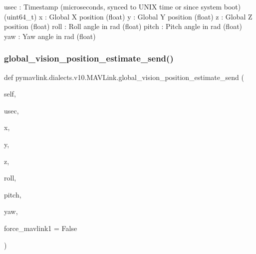 \begin{DoxyVerb}
\begin{DoxyVerb}
\begin{DoxyVerb}usec                      : Timestamp (microseconds, synced to UNIX time or since system boot) (uint64_t)
x                         : Global X position (float)
y                         : Global Y position (float)
z                         : Global Z position (float)
roll                      : Roll angle in rad (float)
pitch                     : Pitch angle in rad (float)
yaw                       : Yaw angle in rad (float)\end{DoxyVerb}
 \mbox{\label{classpymavlink_1_1dialects_1_1v10_1_1MAVLink_a15271ee045cbb9a4bc12fec96e6a43bc}} 
\subsubsection{\texorpdfstring{global\+\_\+vision\+\_\+position\+\_\+estimate\+\_\+send()}{global\_vision\_position\_estimate\_send()}}
{\footnotesize\ttfamily def pymavlink.\+dialects.\+v10.\+M\+A\+V\+Link.\+global\+\_\+vision\+\_\+position\+\_\+estimate\+\_\+send (\begin{DoxyParamCaption}\item[{}]{self,  }\item[{}]{usec,  }\item[{}]{x,  }\item[{}]{y,  }\item[{}]{z,  }\item[{}]{roll,  }\item[{}]{pitch,  }\item[{}]{yaw,  }\item[{}]{force\+\_\+mavlink1 = {\ttfamily False} }\end{DoxyParamCaption})}


\end{DoxyVerb}
\end{DoxyVerb}
